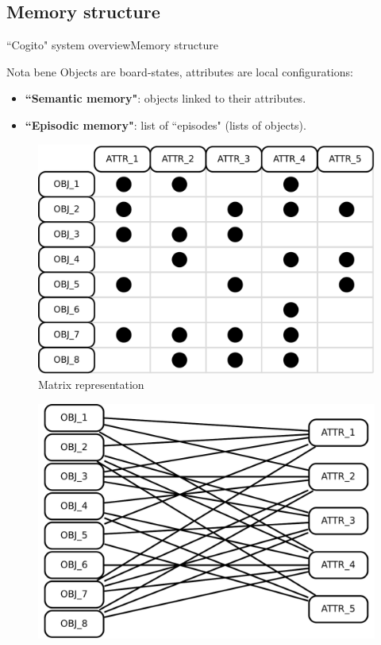 \subsection{Memory structure}
\begin{frame}{``Cogito" system overview}{Memory structure}
\begin{block}{Nota bene}
Objects are board-states, attributes are local configurations:
\begin{itemize}
\item \textbf{``Semantic memory"}: objects linked to their attributes.
\item \textbf{``Episodic memory"}: list of ``episodes" (lists of objects).
\end{itemize}
\end{block}
\begin{figure}[ht]
  \begin{minipage}[t]{0.45\linewidth}
    \vspace{0pt}
    \centering
    \includegraphics[width=\textwidth]{img/cogito/context_matrix}
    \\ Matrix representation
  \end{minipage}
  \hfill
  \begin{minipage}[t]{0.45\textwidth}
    \vspace{0pt}
    \centering
    \includegraphics[width=\textwidth]{img/cogito/context_graph}

\end{minipage}
\end{figure}
\end{frame}
